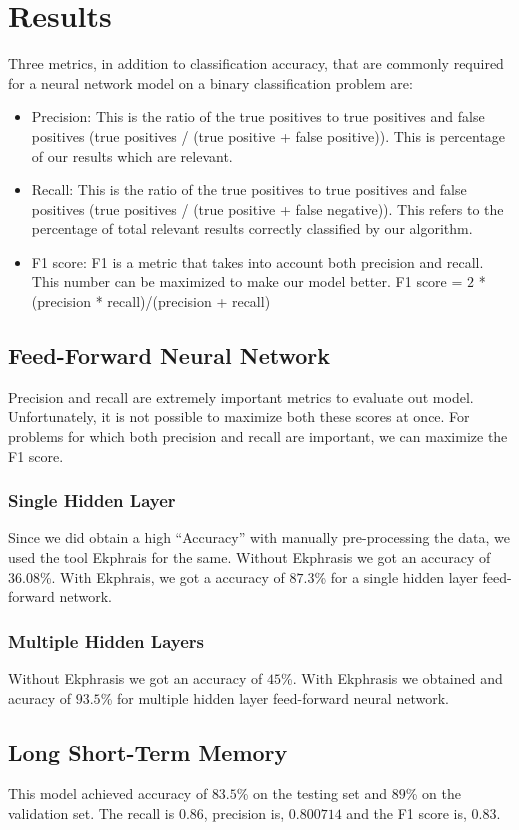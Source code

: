 \section{Results}
\label{sec:results}
Three metrics, in addition to classification accuracy, that are commonly required for a neural network model on a binary classification problem are:
\begin{itemize}
\item Precision: This is the ratio of the true positives to true positives and false positives (true positives / (true positive + false positive)). This is percentage of our results which are relevant.
\item Recall: This is the ratio of the true positives to true positives and false positives (true positives / (true positive + false negative)). This refers to the percentage of total relevant results correctly classified by our algorithm.
\item F1 score: F1 is a metric that takes into account both precision and recall. This number can be maximized to make our model better. F1 score = $2$ *(precision * recall)/(precision + recall)
\end{itemize}
\subsection{Feed-Forward Neural Network}
Precision and recall are extremely important metrics to evaluate out model. Unfortunately, it is not possible to maximize both these scores at once. For problems for which both precision and recall are important, we can maximize the F1 score.

\subsubsection{Single Hidden Layer} Since we did obtain a high ``Accuracy'' with manually pre-processing the data, we used the tool Ekphrais for the same. Without Ekphrasis we got an accuracy of $36.08$\%. With Ekphrais, we got a accuracy of $87.3$\% for a single hidden layer feed-forward network.

\subsubsection{Multiple Hidden Layers} Without Ekphrasis we got an accuracy of $45$\%. With Ekphrasis we obtained and acuracy of $93.5$\% for multiple hidden layer
feed-forward neural network.

\subsection{Long Short-Term Memory}
This model achieved accuracy of $83.5$\% on the testing set and $89$\% on the validation set. The recall is  $0.86$, precision is, $0.800714$ and the F1 score is, $0.83$. 
